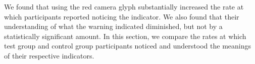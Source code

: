 \documentclass{sigchi}
\begin{document}
We found that using the red camera glyph substantially increased the rate at which participants reported noticing the indicator. We also found that their understanding of what the warning indicated diminished, but not by a statistically significant amount. In this section, we compare the rates at which test group and control group participants noticed and understood the meanings of their respective indicators.




\end{document}
